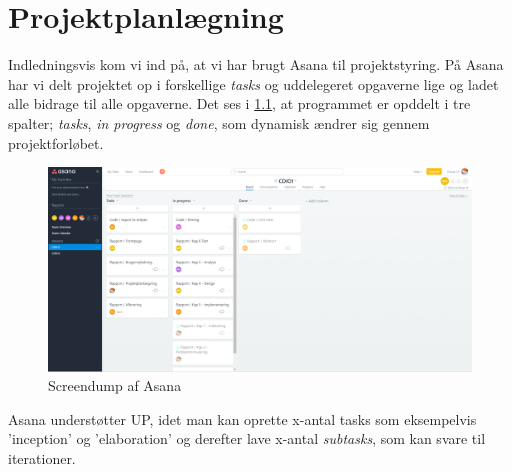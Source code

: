 \chapter{Projektplanlægning}
Indledningsvis kom vi ind på, at vi har brugt Asana til projektstyring.
På Asana har vi delt projektet op i forskellige \textit{tasks} og uddelegeret opgaverne lige og ladet alle bidrage til alle opgaverne.
Det ses i \ref{fig:Asana}, at programmet er opddelt i tre spalter; \textit{tasks}, \textit{in progress} og \textit{done}, som dynamisk ændrer sig gennem projektforløbet.
\begin{figure}[h]
    \begin{center}
        \includegraphics[width=15cm]{graphics/Asana}
        \caption{Screendump af Asana}
    \label{fig:Asana}
    \end{center}
\end{figure}

Asana understøtter UP, idet man kan oprette x-antal tasks som eksempelvis 'inception' og 'elaboration' og derefter lave x-antal \textit{subtasks}, som kan svare til iterationer.